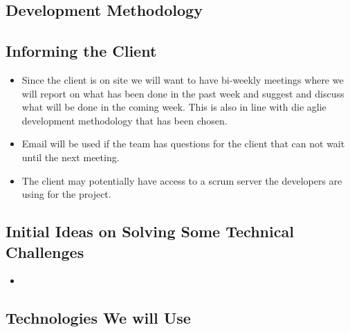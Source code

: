\subsection{Development Methodology}


\subsection{Informing the Client}
\begin{itemize}
	\item Since the client is on site we will want to have bi-weekly meetings where we will report on what has been done in the past week and suggest and discuss what will be done in the coming week. This is also in line with die aglie development methodology that has been chosen.
	\item Email will be used if the team has questions for the client that can not wait until the next meeting.
	\item The client may potentially have access to a scrum server the developers are using for the project.
\end{itemize}

\subsection{Initial Ideas on Solving Some Technical Challenges}
\begin{itemize}
	\item 
\end{itemize}

\subsection{Technologies We will Use}

